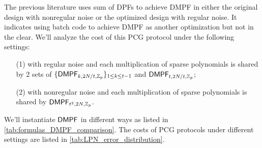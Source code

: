The previous literature uses sum of DPFs to achieve DMPF in either the original design with nonregular noise or the optimized design with regular noise. It indicates using batch code to achieve DMPF as another optimization but not in the clear. We'll analyze the cost of this PCG protocol under the following settings:
\begin{itemize}
    \item[(1)]with regular noise and each multiplication of sparse polynomials is shared by 2 sets of $\{{\sf DMPF}_{k, 2N/t, \mathbb{Z}_p}\}_{1\le k\le t-1}$ and ${\sf DMPF}_{t, 2N/t, \mathbb{Z}_p}$;
    \item[(2)]with nonregular noise and each multiplication of sparse polynomials is shared by ${\sf DMPF}_{t^2, 2N, \mathbb{Z}_p}$. 
\end{itemize}
We'll instantiate ${\sf DMPF}$ in different ways as listed in \cref{tab:formulas_DMPF_comparison}. The costs of PCG protocols under different settings are listed in \cref{tab:LPN_error_distribution}. 
